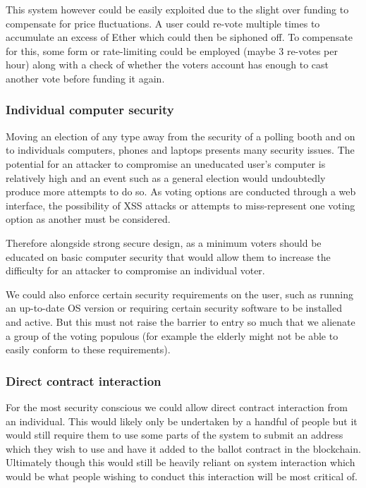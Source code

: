 \documentclass{article}
\begin{document}
	This system however could be easily exploited due to the slight over funding to compensate for price fluctuations. A user could re-vote multiple times to accumulate an excess of Ether which could then be siphoned off. To compensate for this, some form or rate-limiting could be employed (maybe 3 re-votes per hour) along with a check of whether the voters account has enough to cast another vote before funding it again.
	
	\subsubsection{Individual computer security}
	Moving an election of any type away from the security of a polling booth and on to individuals computers, phones and laptops presents many security issues. The potential for an attacker to compromise an uneducated user's computer is relatively high and an event such as a general election would undoubtedly produce more attempts to do so.	As voting options are conducted through a web interface, the possibility of XSS attacks or attempts to miss-represent one voting option as another must be considered.
	
	Therefore alongside strong secure design, as a minimum voters should be educated on basic computer security that would allow them to increase the difficulty for an attacker to compromise an individual voter.	
	
	We could also enforce certain security requirements on the user, such as running an up-to-date OS version or requiring certain security software to be installed and active. But this must not raise the barrier to entry so much that we alienate a group of the voting populous (for example the elderly might not be able to easily conform to these requirements).
	
	\clearpage
	\subsubsection{Direct contract interaction}
	For the most security conscious we could allow direct contract interaction from an individual. This would likely only be undertaken by a handful of people but it would still require them to use some parts of the system to submit an address which they wish to use and have it added to the ballot contract in the blockchain. Ultimately though this would still be heavily reliant on system interaction which would be what people wishing to conduct this interaction will be most critical of.
	
\end{document}
